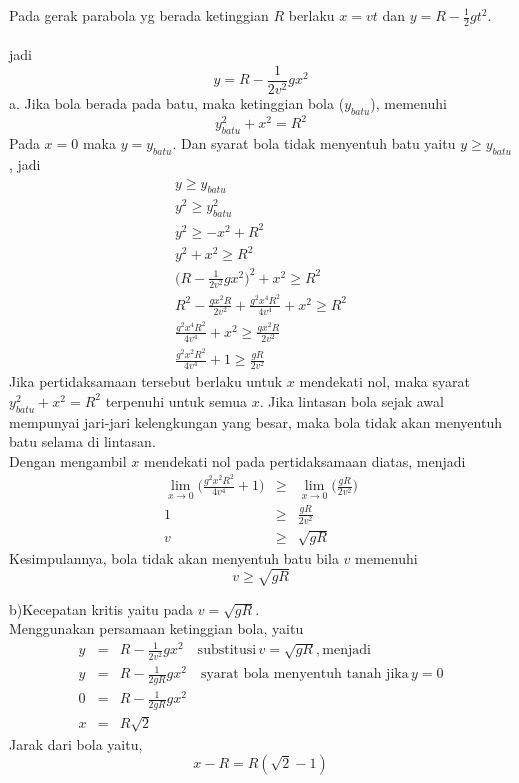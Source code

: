 \begin{solution}
Pada gerak parabola yg berada ketinggian $R$ berlaku $x=v t$ dan $y= R-\frac{1}{2}g t^{2}$.\\ \\
jadi 
	\[y=R-\frac{1}{2 v^{2}} g x^{2}
\]
a. Jika bola berada pada batu, maka ketinggian bola ($y_{batu}$), memenuhi
	\[y^{2}_{batu} +x^{2}=R^{2}
\]
Pada $x=0$ maka $y=y_{batu}$. Dan syarat bola tidak menyentuh batu yaitu $y \ge y_{batu} $, jadi
\begin{eqnarray*}
y \ge y_{batu} \\
y^{2} \ge y^{2}_{batu} \\
y^{2} \ge -x^{2} + R^{2} \\
y^{2} +x^2 \ge R^{2} \\
\big(R-\frac{1}{2 v^{2}} g x^{2}\big)^{2} + x^{2} \ge R^{2} \\
R^{2} -\frac{g x^{2} R}{2 v^{2}}+ \frac{g^{2} x^{4} R^{2}}{4 v^{4}} +x^{2} \ge R^{2} \\
\frac{g^{2} x^{4} R^{2}}{4 v^{4}} +x^{2} \ge \frac{g x^{2} R}{2 v^{2}} \\
\frac{g^{2} x^{2} R^{2}}{4 v^{4}} +1 \ge \frac{g  R}{2 v^{2}}
\end{eqnarray*}
Jika pertidaksamaan tersebut berlaku untuk $x$ mendekati nol, maka syarat $y^{2}_{batu} +x^{2}=R^{2}$ terpenuhi untuk semua $x$. Jika lintasan bola sejak awal mempunyai jari-jari kelengkungan yang besar, maka bola tidak akan menyentuh batu selama di lintasan.\\
Dengan mengambil $x$ mendekati nol pada pertidaksamaan diatas, menjadi
\begin{eqnarray*}
	\lim_{x\rightarrow 0} \big(\frac{g^{2} x^{2} R^{2}}{4 v^{4}} +1\big) &\ge& \lim_{x\rightarrow 0} \big(\frac{g  R}{2 v^{2}} \big) \\
	1 &\ge& \frac{g  R}{2 v^{2}} \\
	v &\ge& \sqrt{g R}
\end{eqnarray*}
Kesimpulannya, bola tidak akan menyentuh batu bila $v$ memenuhi
\begin{equation*}
v \ge \sqrt{g R}
\end{equation*}  

b)Kecepatan kritis yaitu pada $v = \sqrt{g R}$.\\
Menggunakan persamaan ketinggian bola, yaitu
\begin{eqnarray*}
y&=&R-\frac{1}{2 v^{2}} g x^{2} \quad \textrm{substitusi} \,v=\sqrt{g R}, \textrm{menjadi} \\
y&=&R-\frac{1}{2 g R} g x^{2} \quad \textrm{syarat bola menyentuh tanah jika} \, y=0 \\
0&=&R-\frac{1}{2 g R} g x^{2} \\
x&=&R\sqrt{2}
\end{eqnarray*}
Jarak dari bola yaitu, 
\begin{equation*}
x-R=R(\sqrt{2}-1)
\end{equation*}
\end{solution}
